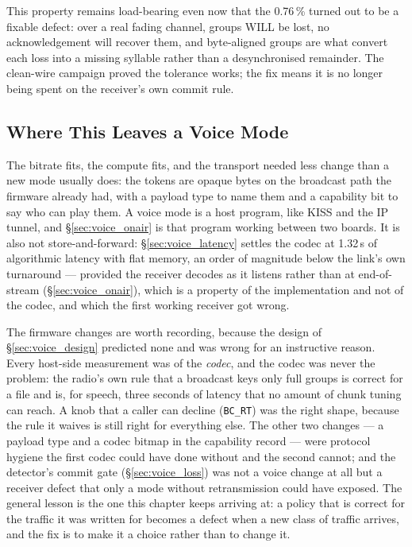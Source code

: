 This property remains load-bearing even now that the 0.76\,\% turned
out to be a fixable defect: over a real fading channel, groups WILL be
lost, no acknowledgement will recover them, and byte-aligned groups
are what convert each loss into a missing syllable rather than a
desynchronised remainder.  The clean-wire campaign proved the
tolerance works; the fix means it is no longer being spent on the
receiver's own commit rule.

\subsection{Where This Leaves a Voice Mode}
\label{sec:voice_status}

The bitrate fits, the compute fits, and the transport needed less
change than a new mode usually does: the tokens are opaque bytes on the
broadcast path the firmware already had, with a payload type to name
them and a capability bit to say who can play them.  A voice mode is a
host program, like KISS and the IP tunnel, and \S\ref{sec:voice_onair}
is that program working between two boards.
It is also not store-and-forward: \S\ref{sec:voice_latency} settles
the codec at 1.32\,s of algorithmic latency with flat memory, an order
of magnitude below the link's own turnaround --- provided the receiver
decodes as it listens rather than at end-of-stream
(\S\ref{sec:voice_onair}), which is a property of the implementation
and not of the codec, and which the first working receiver got wrong.

The firmware changes are worth recording, because the design of
\S\ref{sec:voice_design} predicted none and was wrong for an
instructive reason.  Every host-side measurement was of the
\emph{codec}, and the codec was never the problem: the radio's own
rule that a broadcast keys only full groups is correct for a file and
is, for speech, three seconds of latency that no amount of chunk tuning
can reach.  A knob that a caller can decline (\texttt{BC\_RT}) was
the right shape, because the rule it waives is still right for
everything else.  The other two changes --- a payload type and a codec
bitmap in the capability record --- were protocol hygiene the first
codec could have done without and the second cannot; and the detector's
commit gate (\S\ref{sec:voice_loss}) was not a voice change at all but
a receiver defect that only a mode without retransmission could have
exposed.  The
general lesson is the one this chapter keeps arriving at: a policy that
is correct for the traffic it was written for becomes a defect when a
new class of traffic arrives, and the fix is to make it a choice rather
than to change it.

